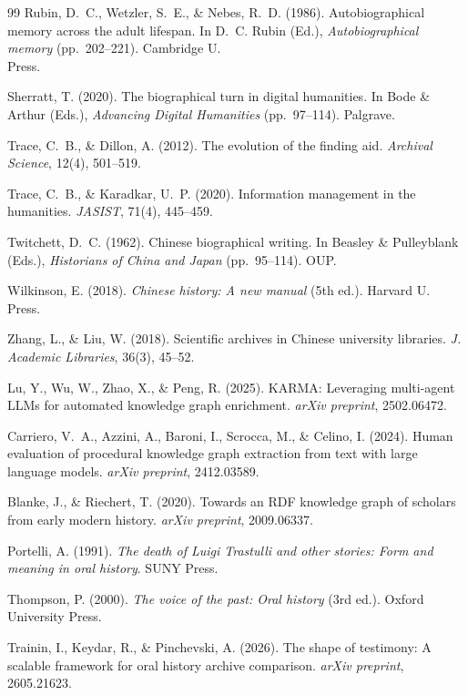 \documentclass[review]{elsarticle}
\begin{document}
\begin{thebibliography}{99}
Rubin, D.~C., Wetzler, S.~E., \& Nebes, R.~D. (1986). Autobiographical memory across the adult lifespan. In D.~C. Rubin (Ed.), \emph{Autobiographical memory} (pp.~202--221). Cambridge U.\\ Press.

Sherratt, T. (2020). The biographical turn in digital humanities. In Bode \& Arthur (Eds.), \emph{Advancing Digital Humanities} (pp.~97--114). Palgrave.

Trace, C.~B., \& Dillon, A. (2012). The evolution of the finding aid. \emph{Archival Science}, 12(4), 501--519.

Trace, C.~B., \& Karadkar, U.~P. (2020). Information management in the humanities. \emph{JASIST}, 71(4), 445--459.

Twitchett, D.~C. (1962). Chinese biographical writing. In Beasley \& Pulleyblank (Eds.), \emph{Historians of China and Japan} (pp.~95--114). OUP.

Wilkinson, E. (2018). \emph{Chinese history: A new manual} (5th ed.). Harvard U.\\ Press.

Zhang, L., \& Liu, W. (2018). Scientific archives in Chinese university libraries. \emph{J. Academic Libraries}, 36(3), 45--52.

Lu, Y., Wu, W., Zhao, X., \& Peng, R. (2025). KARMA: Leveraging multi-agent LLMs for automated knowledge graph enrichment. \emph{arXiv preprint}, 2502.06472.

Carriero, V.~A., Azzini, A., Baroni, I., Scrocca, M., \& Celino, I. (2024). Human evaluation of procedural knowledge graph extraction from text with large language models. \emph{arXiv preprint}, 2412.03589.

Blanke, J., \& Riechert, T. (2020). Towards an RDF knowledge graph of scholars from early modern history. \emph{arXiv preprint}, 2009.06337.

Portelli, A. (1991). \emph{The death of Luigi Trastulli and other stories: Form and meaning in oral history}. SUNY Press.

Thompson, P. (2000). \emph{The voice of the past: Oral history} (3rd ed.). Oxford University Press.

Trainin, I., Keydar, R., \& Pinchevski, A. (2026). The shape of testimony: A scalable framework for oral history archive comparison. \emph{arXiv preprint}, 2605.21623.


\end{thebibliography}
\end{document}
